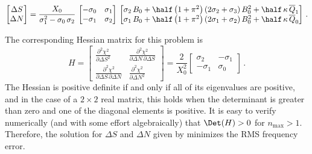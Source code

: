  \begin{equation}\label{eqn:rms_sol_quad}
\begin{bmatrix}
  \Delta S \\
  \Delta N
\end{bmatrix} = \frac{X_0}{\sigma_1^2 - \sigma_0\, \sigma_2}\,
\begin{bmatrix}
  -\sigma_0 & \sigma_1 \\
  -\sigma_1 & \sigma_2
\end{bmatrix}\,
\begin{bmatrix}
  \sigma_2\, B_0 + \half \left(1 + \pi^2\right) \left(2 \sigma_2 + \sigma_3\right) B_0^2 + \half\, \kappa\, \overline{Q}_1 \\
  \sigma_1\, B_0 + \half \left(1 + \pi^2\right) \left(2 \sigma_1 + \sigma_2\right) B_0^2 + \half\, \kappa\, \overline{Q}_0
\end{bmatrix}\, .
 \end{equation}

The corresponding Hessian matrix for this problem is
 \begin{equation}
H = \begin{bmatrix}
      \frac{\partial^2 \chi^2}{\partial \Delta S^2} & \frac{\partial^2 \chi^2}{\partial \Delta N\, \partial \Delta S} \\
      \frac{\partial^2 \chi^2}{\partial \Delta S\, \partial \Delta N} & \frac{\partial^2 \chi^2}{\partial \Delta N^2}
    \end{bmatrix}
  = \frac{2}{X_0^2} \begin{bmatrix}
      \sigma_2 & -\sigma_1 \\
      -\sigma_1 & \sigma_0
    \end{bmatrix}\, .
 \end{equation}
The Hessian is positive definite if and only if all of its eigenvalues are positive, and in the case of a $2 \times 2$ real matrix, this holds when the determinant is greater than zero and one of the diagonal elements is positive. It is easy to verify numerically (and with some effort algebraically) that $\Det(H) > 0$ for $n_\text{max} > 1$. Therefore, the solution for $\Delta S$ and $\Delta N$ given by  minimizes the RMS frequency error.

